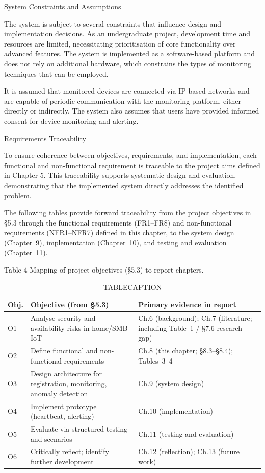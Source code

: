 System Constraints and Assumptions

The system is subject to several constraints that influence design and implementation decisions. As an undergraduate project, development time and resources are limited, necessitating prioritisation of core functionality over advanced features. The system is implemented as a software-based platform and does not rely on additional hardware, which constrains the types of monitoring techniques that can be employed.

It is assumed that monitored devices are connected via IP-based networks and are capable of periodic communication with the monitoring platform, either directly or indirectly. The system also assumes that users have provided informed consent for device monitoring and alerting.

Requirements Traceability

To ensure coherence between objectives, requirements, and implementation, each functional and non-functional requirement is traceable to the project aims defined in Chapter 5. This traceability supports systematic design and evaluation, demonstrating that the implemented system directly addresses the identified problem.

The following tables provide forward traceability from the project objectives in \S{}5.3 through the functional requirements (FR1--FR8) and non-functional requirements (NFR1--NFR7) defined in this chapter, to the system design (Chapter~9), implementation (Chapter~10), and testing and evaluation (Chapter~11).~

Table 4 Mapping of project objectives (\S{}5.3) to report chapters.

\begin{table}[htbp]
  \centering
  \small
  \caption{TABLECAPTION}
  \label{tab:ICA1PLACEHOLDER}
\begin{tabular}{p{}p{}p{}}
\toprule
Obj. & Objective (from \S{}5.3) & Primary evidence in report \\
\midrule
O1 & Analyse security and availability risks in home/SMB IoT & Ch.6 (background); Ch.7 (literature; including Table~1 / \S{}7.6 research gap) \\
\midrule
O2 & Define functional and non-functional requirements & Ch.8 (this chapter; \S{}8.3--\S{}8.4); Tables~3--4 \\
\midrule
O3 & Design architecture for registration, monitoring, anomaly detection & Ch.9 (system design) \\
\midrule
O4 & Implement prototype (heartbeat, alerting) & Ch.10 (implementation) \\
\midrule
O5 & Evaluate via structured testing and scenarios & Ch.11 (testing and evaluation) \\
\midrule
O6 & Critically reflect; identify further development & Ch.12 (reflection); Ch.13 (future work) \\
\bottomrule
\end{tabular}
\end{table}

